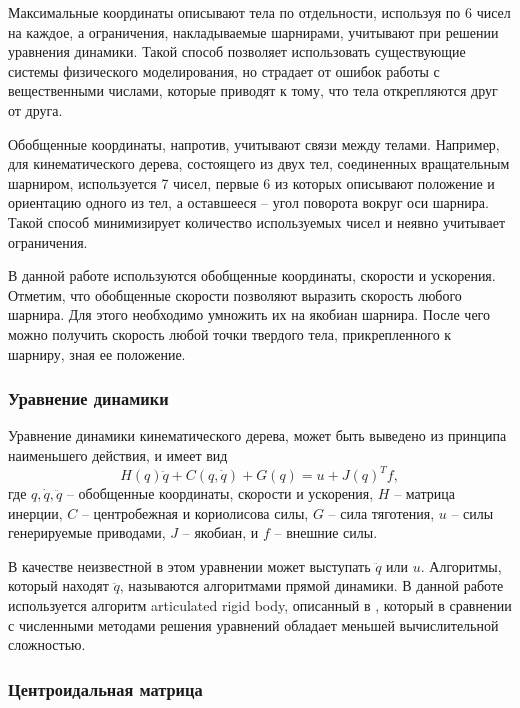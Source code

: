 Максимальные координаты описывают тела по отдельности, используя по 6 чисел на каждое, а ограничения, накладываемые шарнирами, учитывают при решении уравнения динамики. Такой способ позволяет использовать существующие системы физического моделирования, но страдает от ошибок работы с вещественными числами, которые приводят к тому, что тела открепляются друг от друга.

Обобщенные координаты, напротив, учитывают связи между телами. Например, для кинематического дерева, состоящего из двух тел, соединенных вращательным шарниром, используется 7 чисел, первые 6 из которых описывают положение и ориентацию одного из тел, а оставшееся -- угол поворота вокруг оси шарнира. Такой способ минимизирует количество используемых чисел и неявно учитывает ограничения.

В данной работе используются обобщенные координаты, скорости и ускорения. Отметим, что обобщенные скорости позволяют выразить скорость любого шарнира. Для этого необходимо умножить их на якобиан шарнира. После чего можно получить скорость любой точки твердого тела, прикрепленного к шарниру, зная ее положение.

\subsubsection{Уравнение динамики}

Уравнение динамики кинематического дерева, может быть выведено из принципа наименьшего действия, и имеет вид
\[
H(q) \ddot{q} + C(q, \dot{q}) + G(q) = u + J(q)^{T} f,
\]
где $q, \dot{q}, \ddot{q}$ -- обобщенные координаты, скорости и ускорения, $H$ -- матрица инерции, $C$ -- центробежная и кориолисова силы, $G$ -- сила тяготения, $u$ -- силы генерируемые приводами, $J$ -- якобиан, и $f$ -- внешние силы.

В качестве неизвестной в этом уравнении может выступать $\ddot{q}$ или $u$. Алгоритмы, который находят $\ddot{q}$, называются алгоритмами прямой динамики. В данной работе используется алгоритм articulated rigid body, описанный в \cite{Featherstone}, который в сравнении с численными методами решения уравнений обладает меньшей вычислительной сложностью.


\subsubsection{Центроидальная матрица}

